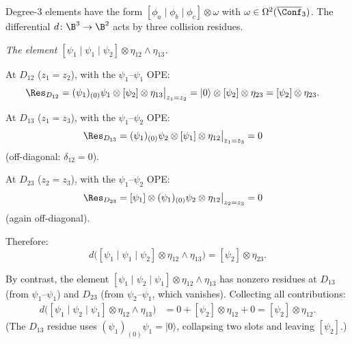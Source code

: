 \begin{computation}
\label{comp:fermion-deg3}
Degree-3 elements have the form
$[\phi_a \mid \phi_b \mid \phi_c] \otimes \omega$
with $\omega \in \Omega^2(\overline{\Conf}_3)$.
The differential $d\colon \B^3 \to \B^2$ acts by three collision residues.

\emph{The element $[\psi_1 \mid \psi_1 \mid \psi_2]
\otimes \eta_{12} \wedge \eta_{13}$.}

At $D_{12}$ ($z_1 = z_2$), with the $\psi_1$--$\psi_1$ OPE:
\begin{align*}
\Res_{D_{12}} &= (\psi_1)_{(0)}\psi_1 \otimes [\psi_2]
\otimes \eta_{13}\big|_{z_1 = z_2}
= |0\rangle \otimes [\psi_2] \otimes \eta_{23}
= [\psi_2] \otimes \eta_{23}.
\end{align*}

At $D_{13}$ ($z_1 = z_3$), with the $\psi_1$--$\psi_2$ OPE:
\begin{align*}
\Res_{D_{13}} &= (\psi_1)_{(0)}\psi_2 \otimes [\psi_1]
\otimes \eta_{12}\big|_{z_1 = z_3}
= 0
\end{align*}
(off-diagonal: $\delta_{12} = 0$).

At $D_{23}$ ($z_2 = z_3$), with the $\psi_1$--$\psi_2$ OPE:
\begin{align*}
\Res_{D_{23}} &= [\psi_1] \otimes (\psi_1)_{(0)}\psi_2
\otimes \eta_{12}\big|_{z_2 = z_3}
= 0
\end{align*}
(again off-diagonal).

Therefore:
\begin{equation}\label{eq:fermion-deg3-ex}
d\bigl([\psi_1 \mid \psi_1 \mid \psi_2]
\otimes \eta_{12} \wedge \eta_{13}\bigr)
= [\psi_2] \otimes \eta_{23}.
\end{equation}

By contrast, the element $[\psi_1 \mid \psi_2 \mid \psi_1]
\otimes \eta_{12} \wedge \eta_{13}$ has nonzero residues at
$D_{13}$ (from $\psi_1$--$\psi_1$) and $D_{23}$ (from $\psi_2$--$\psi_1$,
which vanishes). Collecting all contributions:
\begin{align*}
d\bigl([\psi_1 \mid \psi_2 \mid \psi_1]
\otimes \eta_{12} \wedge \eta_{13}\bigr)
&= 0 + [\psi_2] \otimes \eta_{12} + 0
= [\psi_2] \otimes \eta_{12}.
\end{align*}
(The $D_{13}$ residue uses $(\psi_1)_{(0)}\psi_1 = |0\rangle$,
collapsing two slots and leaving $[\psi_2]$.)
\end{computation}

